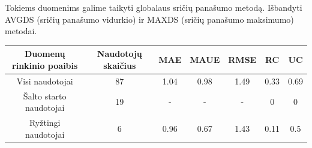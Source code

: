 \documentclass{VUMIFInfMagistrinis}
\begin{document}
\indent
Tokiems duomenims galime taikyti globalaus sričių panašumo metodą. Išbandyti AVGDS (sričių panašumo vidurkio) ir MAXDS (sričių panašumo maksimumo) metodai.
\begin{center}
	\begin{tabular}{||c c c c c c c ||} 
		Duomenų rinkinio poaibis & Naudotojų skaičius & MAE & MAUE & RMSE & RC & UC \\
		\hline
		Visi naudotojai & 87 & 1.04 & 0.98 & 1.49 & 0.33 & 0.69 \\
		\hline
		Šalto starto naudotojai & 19 & - & - & - & 0 & 0 \\
		\hline
		Ryžtingi naudotojai & 6 & 0.96 & 0.67 & 1.43 & 0.11 & 0.5 \\
	\end{tabular}
\end{center}
\end{document}
